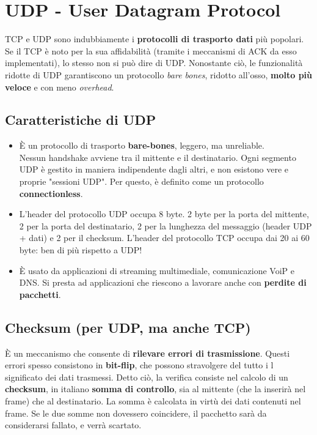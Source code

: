 \newpage

\section{UDP - User Datagram Protocol}
TCP e UDP sono indubbiamente i \textbf{protocolli di trasporto dati} più popolari. Se il TCP è noto per la sua affidabilità (tramite i meccanismi di ACK da esso implementati), lo stesso non si può dire di UDP. Nonostante ciò, le funzionalità ridotte di UDP garantiscono un protocollo \textit{bare bones}, ridotto all'osso, \textbf{molto più veloce} e con meno \textit{overhead}.

\subsection{Caratteristiche di UDP}

\begin{itemize}
	\item È un protocollo di trasporto \textbf{bare-bones}, leggero, ma unreliable.\\ 
	Nessun handshake avviene tra il mittente e il destinatario. Ogni segmento UDP è gestito in maniera indipendente dagli altri, e non esistono vere e proprie "sessioni UDP". Per questo, è definito come un protocollo \textbf{connectionless}.
	
	\item L'header del protocollo UDP occupa 8 byte. 2 byte per la porta del mittente, 2 per la porta del destinatario, 2 per la lunghezza del messaggio (header UDP + dati) e 2 per il checksum. L'header  del protocollo TCP occupa dai 20 ai 60 byte: ben di più rispetto a UDP!
	
	\item È usato da applicazioni di streaming multimediale, comunicazione VoiP e DNS.  Si presta ad applicazioni che riescono a lavorare anche con \textbf{perdite di pacchetti}.
\end{itemize}

\subsection{Checksum (per UDP, ma anche TCP)}
È un meccanismo che consente di \textbf{rilevare errori di trasmissione}. Questi errori spesso consistono in \textbf{bit-flip}, che possono stravolgere del tutto i l significato dei dati trasmessi. Detto ciò, la verifica consiste nel calcolo di un \textbf{checksum}, in italiano \textbf{somma di controllo}, sia al mittente (che la inserirà nel frame) che al destinatario. La somma è calcolata in virtù dei dati contenuti nel frame. Se le due somme non dovessero coincidere, il pacchetto sarà da considerarsi fallato, e verrà scartato. 

